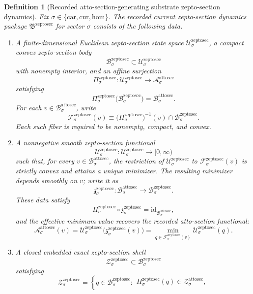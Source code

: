 \documentclass[11pt]{article}
\newcommand{\Car}{\mathrm{car}}
\newcommand{\Cur}{\mathrm{cur}}
\newcommand{\Hom}{\mathrm{hom}}
\newcommand{\AttoSectionSpace}[1]{\mathcal A_{#1}^{\mathrm{attosec}}}
\newcommand{\AttoSectionBody}[1]{\mathcal B_{#1}^{\mathrm{attosec}}}
\newcommand{\AttoSectionFunctional}[1]{\mathscr A_{#1}^{\mathrm{attosec}}}
\newcommand{\AttoSectionShell}[1]{\mathcal Z_{#1}^{\mathrm{attosec}}}
\newcommand{\ZeptoSectionPackage}{\mathfrak B^{\mathrm{zeptosec}}}
\newcommand{\ZeptoSectionSpace}[1]{\mathcal U_{#1}^{\mathrm{zeptosec}}}
\newcommand{\ZeptoSectionBody}[1]{\mathcal B_{#1}^{\mathrm{zeptosec}}}
\newcommand{\ZeptoSectionProj}[1]{\Pi_{#1}^{\mathrm{zeptosec}}}
\newcommand{\ZeptoSectionFiber}[2]{\mathcal F_{#1}^{\mathrm{zeptosec}}(#2)}
\newcommand{\ZeptoSectionAttoMin}[1]{\mathfrak z_{#1}^{\mathrm{zeptosec}}}
\newcommand{\ZeptoSectionFunctional}[1]{\mathscr U_{#1}^{\mathrm{zeptosec}}}
\newcommand{\ZeptoSectionShell}[1]{\mathcal Z_{#1}^{\mathrm{zeptosec}}}
\newtheorem{definition}{Definition}
\begin{document}
\begin{definition}[Recorded atto-section-generating substrate zepto-section dynamics]
\label{def:zeptosec}
Fix \(\sigma\in\{\Car,\Cur,\Hom\}\). The recorded current zepto-section dynamics package \(\ZeptoSectionPackage\) for sector \(\sigma\) consists of the following data.
\begin{enumerate}
    \item A finite-dimensional Euclidean zepto-section state space \(\ZeptoSectionSpace{\sigma}\), a compact convex zepto-section body
    \[
    \ZeptoSectionBody{\sigma}\subset\ZeptoSectionSpace{\sigma}
    \]
    with nonempty interior, and an affine surjection
    \[
    \ZeptoSectionProj{\sigma}:\ZeptoSectionSpace{\sigma}\to\AttoSectionSpace{\sigma}
    \]
    satisfying
    \[
    \ZeptoSectionProj{\sigma}\bigl(\ZeptoSectionBody{\sigma}\bigr)=\AttoSectionBody{\sigma}.
    \]
    For each \(v\in\AttoSectionBody{\sigma}\), write
    \[
    \ZeptoSectionFiber{\sigma}{v}
    \equiv
    \bigl(\ZeptoSectionProj{\sigma}\bigr)^{-1}(v)\cap\ZeptoSectionBody{\sigma}.
    \]
    Each such fiber is required to be nonempty, compact, and convex.
    \item A nonnegative smooth zepto-section functional
    \[
    \ZeptoSectionFunctional{\sigma}:\ZeptoSectionSpace{\sigma}\to[0,\infty)
    \]
    such that, for every \(v\in\AttoSectionBody{\sigma}\), the restriction of \(\ZeptoSectionFunctional{\sigma}\) to \(\ZeptoSectionFiber{\sigma}{v}\) is strictly convex and attains a unique minimizer. The resulting minimizer depends smoothly on \(v\); write it as
    \[
    \ZeptoSectionAttoMin{\sigma}:\AttoSectionBody{\sigma}\to\ZeptoSectionBody{\sigma}.
    \]
    These data satisfy
    \[
    \ZeptoSectionProj{\sigma}\circ\ZeptoSectionAttoMin{\sigma}
    =
    \mathrm{id}_{\AttoSectionBody{\sigma}},
    \]
    and the effective minimum value recovers the recorded atto-section functional:
    \[
    \AttoSectionFunctional{\sigma}(v)
    =
    \ZeptoSectionFunctional{\sigma}\bigl(\ZeptoSectionAttoMin{\sigma}(v)\bigr)
    =
    \min_{q\in\ZeptoSectionFiber{\sigma}{v}}
    \ZeptoSectionFunctional{\sigma}(q).
    \]
    \item A closed embedded exact zepto-section shell
    \[
    \ZeptoSectionShell{\sigma}\subset\ZeptoSectionBody{\sigma}
    \]
    satisfying
    \[
    \ZeptoSectionShell{\sigma}
    =
    \left\{
    q\in\ZeptoSectionBody{\sigma}:
    \begin{array}{l}
    \ZeptoSectionProj{\sigma}(q)\in\AttoSectionShell{\sigma},\\[0.2em]

\end{array}\]
\end{enumerate}
\end{definition}
\end{document}
